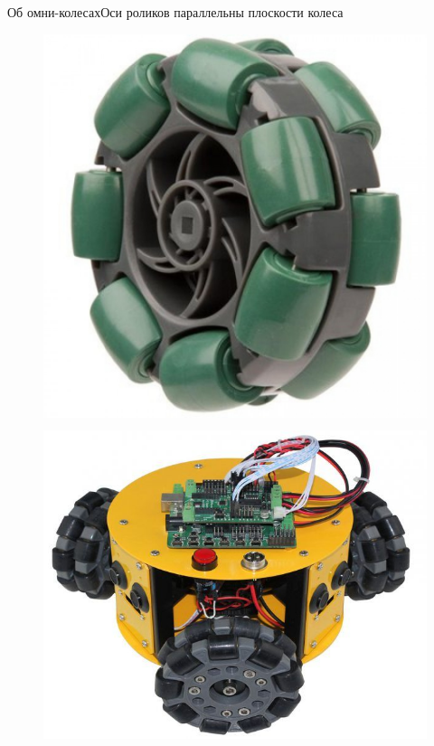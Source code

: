 \begin{frame}{Об омни-колесах}{Оси роликов параллельны плоскости колеса}
\begin{figure}[H]
\begin{columns}
                \centering
                \includegraphics[width=\linewidth]{content/pic/photo/wheel_two_rows.jpg}
        \end{columns}
    \end{figure}
    \vspace{-10pt}
    \begin{figure}[H]
        \centering
        \begin{columns}
                \centering
                \includegraphics[width=\linewidth]{content/pic/photo/vehicle_three_two_row.jpg}

\end{columns}
\end{figure}
\end{frame}
